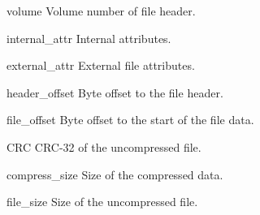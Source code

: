 \begin{memberdesc}[ZipInfo]{volume}
  Volume number of file header.
\end{memberdesc}

\begin{memberdesc}[ZipInfo]{internal_attr}
  Internal attributes.
\end{memberdesc}

\begin{memberdesc}[ZipInfo]{external_attr}
 External file attributes.
\end{memberdesc}

\begin{memberdesc}[ZipInfo]{header_offset}
  Byte offset to the file header.
\end{memberdesc}

\begin{memberdesc}[ZipInfo]{file_offset}
  Byte offset to the start of the file data.
\end{memberdesc}

\begin{memberdesc}[ZipInfo]{CRC}
  CRC-32 of the uncompressed file.
\end{memberdesc}

\begin{memberdesc}[ZipInfo]{compress_size}
  Size of the compressed data.
\end{memberdesc}

\begin{memberdesc}[ZipInfo]{file_size}
  Size of the uncompressed file.
\end{memberdesc}
